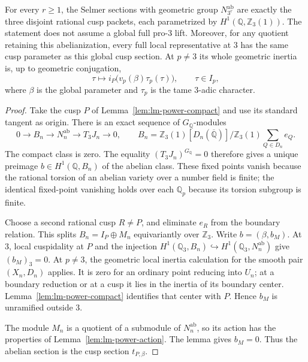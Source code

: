 \begin{theorem}
\label{thm:lm-power-abelian}
For every $r\ge1$, the Selmer sections with geometric group
$N_{3^r}^{\mathrm{ab}}$ are exactly the three disjoint
rational cusp packets, each parametrized by
$H^1(\mathbb Q,\mathbb Z_3(1))$.
The statement does not assume a global full pro-$3$ lift.
Moreover, for any quotient retaining this abelianization,
every full local representative at $3$ has the same cusp
parameter as this global cusp section.  At $p\ne3$ its
whole geometric inertia is, up to geometric conjugation,
\[
 \tau\longmapsto
 i_P\bigl(v_p(\beta)\tau_p(\tau)\bigr),
 \qquad \tau\in I_p,
\]
where $\beta$ is the global parameter and $\tau_p$ is
the tame $3$-adic character.
\end{theorem}
\begin{proof}
Take the cusp $P$ of Lemma~\ref{lem:lm-power-compact}
and use its standard tangent as origin.  There is an
exact sequence of $G_{\mathbb Q}$-modules
\[
 0\longrightarrow B_n\longrightarrow N_n^{\mathrm{ab}}
 \longrightarrow T_3J_n\longrightarrow0,
 \qquad
 B_n=\mathbb Z_3(1)[D_n(\overline{\mathbb Q})]
       /\mathbb Z_3(1)\sum_{Q\in D_n}e_Q.
\]
The compact class is zero.  The equality
$(T_3J_n)^{G_{\mathbb Q}}=0$ therefore gives a unique
preimage $b\in H^1(\mathbb Q,B_n)$ of the abelian class.
These fixed points vanish because the rational torsion
of an abelian variety over a number field is finite;
the identical fixed-point vanishing holds over each
$\mathbb Q_p$ because its torsion subgroup is finite.

Choose a second rational cusp $R\ne P$, and eliminate
$e_R$ from the boundary relation.  This splits
$B_n=I_P\oplus M_n$ equivariantly over $\mathbb Z_3$.
Write $b=(\beta,b_M)$.  At $3$, local cuspidality at $P$
and the injection
$H^1(\mathbb Q_3,B_n)\hookrightarrow
 H^1(\mathbb Q_3,N_n^{\mathrm{ab}})$ give $(b_M)_3=0$.
At $p\ne3$, the geometric local inertia calculation for
the smooth pair $(X_n,D_n)$ applies.  It is zero for
an ordinary point reducing into $U_n$; at a boundary
reduction or at a cusp it lies in the inertia of its
boundary center.  Lemma~\ref{lem:lm-power-compact}
identifies that center with $P$.  Hence $b_M$ is
unramified outside $3$.

The module $M_n$ is a quotient of a submodule of
$N_n^{\mathrm{ab}}$, so its action has the properties
of Lemma~\ref{lem:lm-power-action}.  The lemma gives
$b_M=0$.  Thus the abelian section is the cusp section
$t_{P,\beta}$.


\end{proof}
